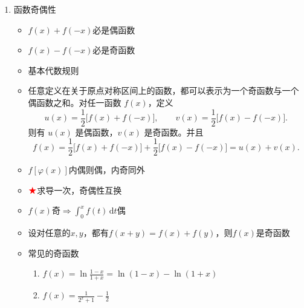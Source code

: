 \documentclass[../book.tex]{subfiles}
\begin{document}
\begin{enumerate}
        \item 函数奇偶性
        \begin{itemize}
            \item $f(x) + f(-x)$必是偶函数
            \item $f(x) - f(-x)$必是奇函数
            \item 基本代数规则
            \item 任意定义在关于原点对称区间上的函数，都可以表示为一个奇函数与一个偶函数之和。对任一函数 $f(x)$，定义
            \[
                u(x) = \frac{1}{2}\bigl[f(x) + f(-x)\bigr], \qquad
                v(x) = \frac{1}{2}\bigl[f(x) - f(-x)\bigr].
            \]
            则有 $u(x)$ 是偶函数，$v(x)$ 是奇函数。并且
            \[
                f(x)
                = \frac{1}{2}\bigl[f(x) + f(-x)\bigr]
                + \frac{1}{2}\bigl[f(x) - f(-x)\bigr]
                = u(x) + v(x).
            \]
            \item $f[\varphi(x)]$内偶则偶，内奇同外
            \item $\color{red}{\bigstar}$求导一次，奇偶性互换
            \item $f(x)$奇$\Rightarrow \int_0^x f(t)\,\mathrm{d}t$偶
            \item 设对任意的$x, y$，都有$f(x + y) = f(x) + f(y)$，则$f(x)$是奇函数
            \item 常见的奇函数
            \begin{enumerate}
                \item $f(x) = \ln\displaystyle\frac{1-x}{1+x} = \ln(1-x) - \ln(1+x)$
                \item $f(x) = \displaystyle\frac{1}{2^x + 1} - \frac{1}{2}$

\end{enumerate}
\end{itemize}
\end{enumerate}
\end{document}
